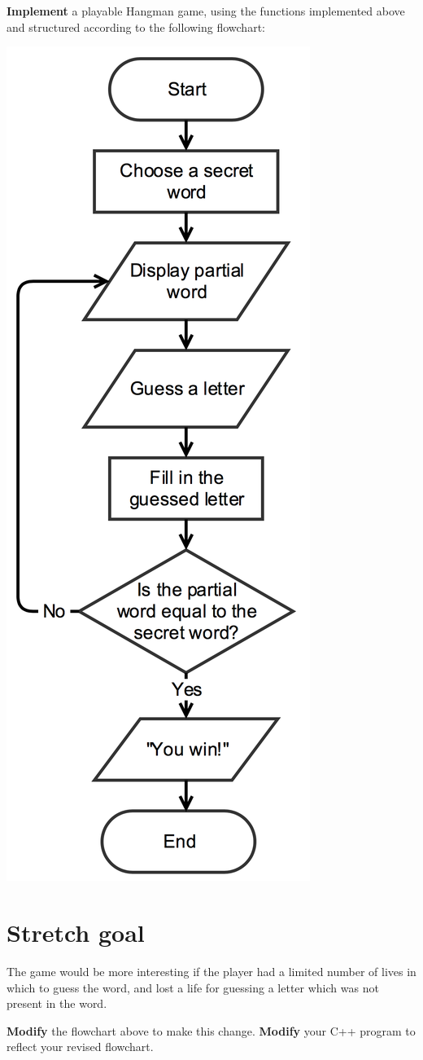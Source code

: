 \textbf{Implement} a playable Hangman game, using the functions implemented above and structured
according to the following flowchart:

\begin{center}
\includegraphics[height=0.5\textheight]{hangman_flowchart.png}
\end{center}

\section{Stretch goal} \label{stretch-a}

The game would be more interesting if the player had a limited number of lives in which to guess the word,
and lost a life for guessing a letter which was not present in the word.

\textbf{Modify} the flowchart above to make this change. \textbf{Modify} your C++ program to reflect your revised flowchart.
